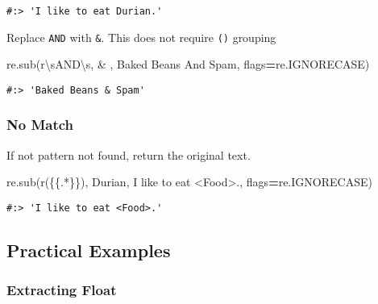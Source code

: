 \documentclass[
]{book}
\newenvironment{Shaded}{\begin{snugshade}}{\end{snugshade}}
\newcommand{\NormalTok}[1]{#1}
\newcommand{\OperatorTok}[1]{\textcolor[rgb]{0.43,0.43,0.43}{\textbf{#1}}}
\newcommand{\SpecialCharTok}[1]{\textcolor[rgb]{0,0,0}{#1}}
\newcommand{\StringTok}[1]{\textcolor[rgb]{0.5,0.5,0.5}{#1}}
\newcommand{\VerbatimStringTok}[1]{\textcolor[rgb]{0.5,0.5,0.5}{#1}}
\begin{document}
\begin{verbatim}
#:> 'I like to eat Durian.'
\end{verbatim}

Replace \texttt{AND} with \texttt{\&}. This does not require \texttt{()} grouping

\begin{Shaded}
\begin{Highlighting}[]
\NormalTok{re.sub(}\VerbatimStringTok{r\textquotesingle{}\textbackslash{}sAND\textbackslash{}s\textquotesingle{}}\NormalTok{, }\StringTok{\textquotesingle{} \& \textquotesingle{}}\NormalTok{, }\StringTok{\textquotesingle{}Baked Beans And Spam\textquotesingle{}}\NormalTok{, flags}\OperatorTok{=}\NormalTok{re.IGNORECASE)}
\end{Highlighting}
\end{Shaded}

\begin{verbatim}
#:> 'Baked Beans & Spam'
\end{verbatim}

\hypertarget{no-match}{%
\subsubsection{No Match}\label{no-match}}

If not pattern not found, return the original text.

\begin{Shaded}
\begin{Highlighting}[]
\NormalTok{re.sub(}\VerbatimStringTok{r\textquotesingle{}(}\SpecialCharTok{\{\{}\VerbatimStringTok{.*}\SpecialCharTok{\}\}}\VerbatimStringTok{)\textquotesingle{}}\NormalTok{, }\StringTok{\textquotesingle{}Durian\textquotesingle{}}\NormalTok{, }\StringTok{\textquotesingle{}I like to eat \textless{}Food\textgreater{}.\textquotesingle{}}\NormalTok{, flags}\OperatorTok{=}\NormalTok{re.IGNORECASE)}
\end{Highlighting}
\end{Shaded}

\begin{verbatim}
#:> 'I like to eat <Food>.'
\end{verbatim}

\hypertarget{practical-examples}{%
\subsection{Practical Examples}\label{practical-examples}}

\hypertarget{extracting-float}{%
\subsubsection{Extracting Float}\label{extracting-float}}
\end{document}
